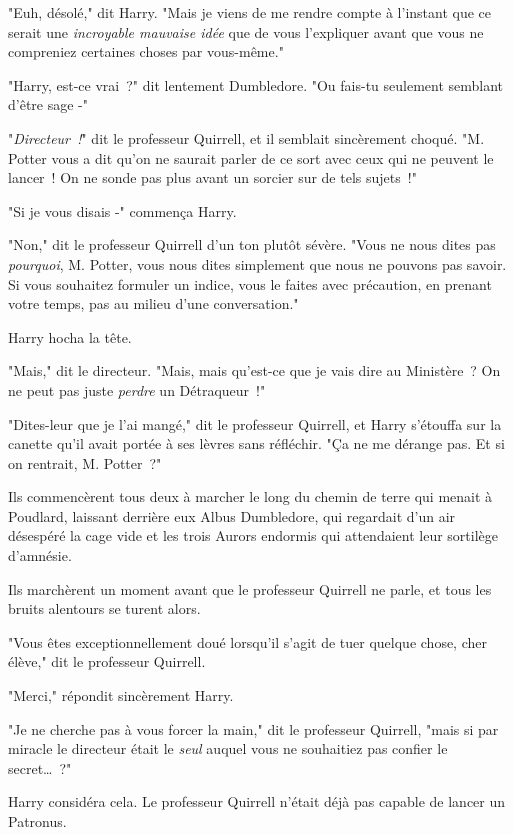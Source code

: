 "Euh, désolé," dit Harry. "Mais je viens de me rendre compte à l'instant que ce serait une \emph{incroyable mauvaise idée} que de vous l'expliquer avant que vous ne compreniez certaines choses par vous-même."

"Harry, est-ce vrai~?" dit lentement Dumbledore. "Ou fais-tu seulement semblant d'être sage -"

"\emph{Directeur~!}" dit le professeur Quirrell, et il semblait sincèrement choqué. "M. Potter vous a dit qu'on ne saurait parler de ce sort avec ceux qui ne peuvent le lancer~! On ne sonde pas plus avant un sorcier sur de tels sujets~!"

"Si je vous disais -" commença Harry.

"Non," dit le professeur Quirrell d'un ton plutôt sévère. "Vous ne nous dites pas \emph{pourquoi}, M. Potter, vous nous dites simplement que nous ne pouvons pas savoir. Si vous souhaitez formuler un indice, vous le faites avec précaution, en prenant votre temps, pas au milieu d'une conversation."

Harry hocha la tête.

"Mais," dit le directeur. "Mais, mais qu'est-ce que je vais dire au Ministère~? On ne peut pas juste \emph{perdre} un Détraqueur~!"

"Dites-leur que je l'ai mangé," dit le professeur Quirrell, et Harry s'étouffa sur la canette qu'il avait portée à ses lèvres sans réfléchir. "Ça ne me dérange pas. Et si on rentrait, M. Potter~?"

Ils commencèrent tous deux à marcher le long du chemin de terre qui menait à Poudlard, laissant derrière eux Albus Dumbledore, qui regardait d'un air désespéré la cage vide et les trois Aurors endormis qui attendaient leur sortilège d'amnésie.


Ils marchèrent un moment avant que le professeur Quirrell ne parle, et tous les bruits alentours se turent alors.

"Vous êtes exceptionnellement doué lorsqu'il s'agit de tuer quelque chose, cher élève," dit le professeur Quirrell.

"Merci," répondit sincèrement Harry.

"Je ne cherche pas à vous forcer la main," dit le professeur Quirrell, "mais si par miracle le directeur était le \emph{seul} auquel vous ne souhaitiez pas confier le secret…~?"

Harry considéra cela. Le professeur Quirrell n'était déjà pas capable de lancer un Patronus.

